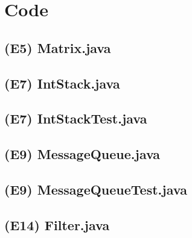 \documentclass[main.tex]{subfiles}
\begin{document}
\section*{Code}

\subsection*{(E5) Matrix.java}


\newpage
\subsection*{(E7) IntStack.java}


\newpage
\subsection*{(E7) IntStackTest.java}


\newpage
\subsection*{(E9) MessageQueue.java}


\newpage
\subsection*{(E9) MessageQueueTest.java}



\newpage
\subsection*{(E14) Filter.java}

\end{document}
